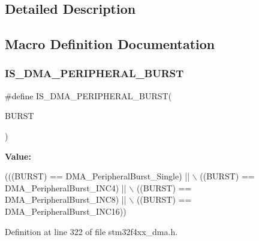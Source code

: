 \subsection{Detailed Description}


\subsection{Macro Definition Documentation}
\mbox{\label{group___d_m_a__peripheral__burst_ga7c60961178e2a32e9e364a220a8aca88}} 
\subsubsection{\texorpdfstring{I\+S\+\_\+\+D\+M\+A\+\_\+\+P\+E\+R\+I\+P\+H\+E\+R\+A\+L\+\_\+\+B\+U\+R\+ST}{IS\_DMA\_PERIPHERAL\_BURST}}
{\footnotesize\ttfamily \#define I\+S\+\_\+\+D\+M\+A\+\_\+\+P\+E\+R\+I\+P\+H\+E\+R\+A\+L\+\_\+\+B\+U\+R\+ST(\begin{DoxyParamCaption}\item[{}]{B\+U\+R\+ST }\end{DoxyParamCaption})}

{\bfseries Value\+:}
\begin{DoxyCode}
(((BURST) == DMA\_PeripheralBurst\_Single) || \(\backslash\)
                                        ((BURST) == DMA\_PeripheralBurst\_INC4)  || \(\backslash\)
                                        ((BURST) == DMA\_PeripheralBurst\_INC8)  || \(\backslash\)
                                        ((BURST) == DMA\_PeripheralBurst\_INC16))
\end{DoxyCode}


Definition at line 322 of file stm32f4xx\+\_\+dma.\+h.

